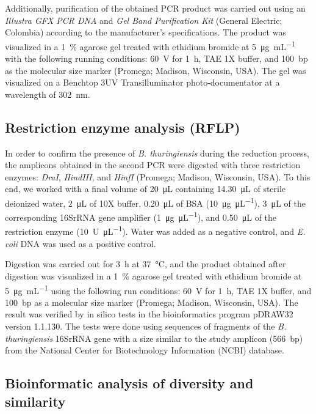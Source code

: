 \documentclass{univsciauth}
\begin{document}
Additionally, purification of the obtained PCR product was carried out
using an \emph{Illustra GFX PCR DNA} and \emph{Gel Band Purification
Kit} (General Electric; Colombia) according to the manufacturer's
specifications. The product was visualized in a \SI{1}{\%} agarose gel treated
with ethidium bromide at \SI{5}{\micro g.mL^{-1}} with the following running conditions:
\SI{60}{V} for \SI{1}{h}, TAE 1X buffer, and \SI{100}{bp} as the molecular size marker
(Promega; Madison, Wisconsin, USA). The gel was visualized on a Benchtop
3UV Transilluminator photo-documentator at a wavelength of \SI{302}{nm}.

\subsection{Restriction enzyme analysis (RFLP)}

In order to confirm the presence of \emph{B. thuringiensis}
during the reduction process, the amplicons obtained in the second PCR
were digested with three restriction enzymes: \emph{DraI},
\emph{HindIII,} and \emph{HinfI} (Promega; Madison, Wisconsin,
USA). To this end, we worked with a final volume of \SI{20}{\micro\liter}
containing \SI{14.30}{\micro\liter} of sterile deionized water, \SI{2}{\micro\liter} of 10X buffer,
\SI{0.20}{\micro\liter} of BSA (\SI{10}{\micro g.\micro L^{-1}}), \SI{3}{\micro\liter} of the corresponding 16SrRNA gene amplifier
(\SI{1}{\micro g.\micro L^{-1}}), and \SI{0.50}{\micro\liter} of the restriction enzyme (\SI{10}{U.\micro L^{-1}}). Water was
added as a negative control, and \emph{E. coli} DNA was used as a
positive control.

Digestion was carried out for \SI{3}{h} at \SI{37}{\celsius}, and the product
obtained after digestion was visualized in a \SI{1}{\%} agarose gel treated
with ethidium bromide at \SI{5}{μg.mL^{-1}} using the following run conditions:
\SI{60}{V} for \SI{1}{h}, TAE 1X buffer, and \SI{100}{bp} as a molecular size marker
(Promega; Madison, Wisconsin, USA). The result was verified by
in silico tests in the bioinformatics program pDRAW32 version 1.1.130.
The tests were done using sequences of fragments of the \emph{B.
thuringiensis} 16SrRNA gene with a size similar to the study amplicon
(\SI{566}{bp}) from the National Center for Biotechnology Information (NCBI)
database.

\subsection{Bioinformatic analysis of diversity and similarity}
\end{document}
